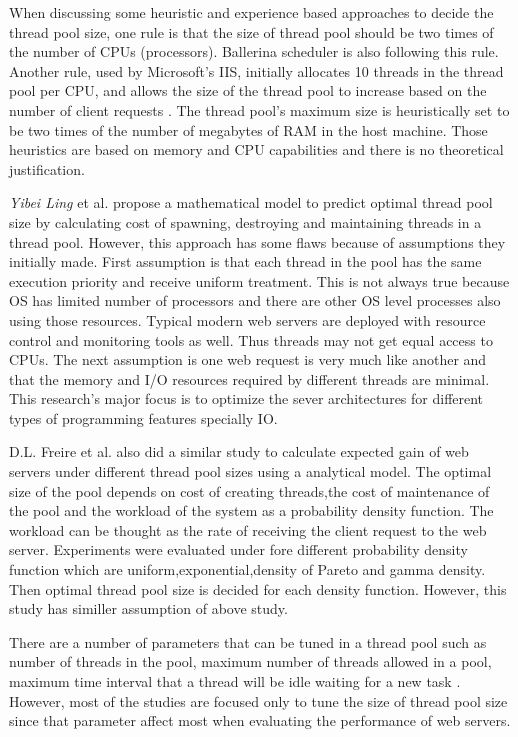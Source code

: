 When discussing some heuristic and experience based approaches to decide the thread pool size, one rule is that the size of thread pool should be two times of the number of CPUs (processors). Ballerina scheduler is also following this rule. Another rule, used by Microsoft's IIS, initially allocates 10 threads in the thread pool per CPU, and allows the size of the thread pool to increase based on the number of client requests \cite{thread_pool_analysis}. The thread pool's maximum size is heuristically set to be two times of the number of megabytes of RAM in the host machine. Those heuristics are based on memory and CPU capabilities and there is no theoretical justification.

\textit{Yibei Ling} et al. \cite{thread_pool_analysis} propose a mathematical model to predict optimal thread pool size  by calculating cost of spawning, destroying and maintaining threads in a thread pool. However, this approach has some flaws because of assumptions they initially made. First assumption is that each thread in the pool has the same execution priority and receive uniform treatment. This is not always true because OS has limited number of processors and there are other OS level processes also using those resources. Typical modern web servers are deployed with resource control and monitoring tools as well. Thus threads may not get equal access to CPUs. The next assumption is one web request is very much like another  and that the memory and I/O resources required by different threads are minimal. This research's major focus is to optimize the sever architectures for different types of programming features specially IO. 

D.L. Freire et al.\cite{math_aproach_thread_pool_tuning} also did a similar study to calculate expected gain of web servers under different thread pool sizes using a analytical model. The optimal size of the pool depends on cost of creating threads,the cost of maintenance of the pool and the workload of the system as a probability density function. The workload can be thought as the rate of receiving the client request to the web server. Experiments were evaluated under fore different  probability density function which are uniform,exponential,density of Pareto and gamma density. Then optimal thread pool size is decided for each density function. However, this study has similler assumption of above study. 
 
There are a number of parameters that can be tuned in a thread pool such as number of threads in the pool, maximum number of threads allowed in a pool, maximum time interval that a thread will be idle waiting for a new task \cite{math_aproach_thread_pool_tuning}. However, most of the studies are focused only to tune the size of thread pool size since that parameter affect most when evaluating the performance of web servers.

